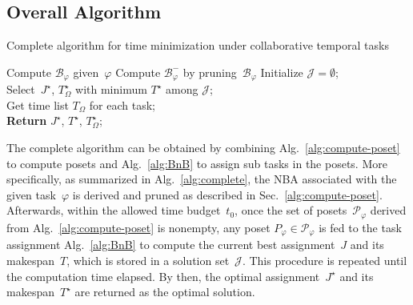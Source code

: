 \subsection{Overall Algorithm}\label{subsubsec:overall-algorithm}

\begin{algorithm}[t]\footnotesize
	\caption{\footnotesize Complete algorithm for time minimization
        under collaborative temporal tasks}
	\label{alg:complete}
	Compute $\mathcal{B}_{\varphi}$ given~$\varphi$ 
	Compute $\mathcal{B}^{-}_{\varphi}$ by pruning~$\mathcal{B}_{\varphi}$
        Initialize $\mathcal{J}=\emptyset$;\\
        Select~$J^\star$, $T^\star_\Omega$ with minimum $T^\star$ among $\mathcal{J}$;\\
        Get time list $T_\Omega$ for each task;\\
	\textbf{Return} $J^\star$, $T^\star$, $T^\star_\Omega$;
\end{algorithm}

The complete algorithm can be obtained by combining
Alg.~\ref{alg:compute-poset} to compute posets
and Alg.~\ref{alg:BnB} to assign sub tasks in the posets.
More specifically, as summarized in Alg.~\ref{alg:complete},
the NBA associated with the given task~$\varphi$ is derived and pruned as
described in Sec.~\ref{alg:compute-poset}.
Afterwards, within the allowed time budget~$t_0$,
once the set of posets~$\mathcal{P}_{\varphi}$ derived from
Alg.~\ref{alg:compute-poset}
is nonempty, any poset $P_\varphi\in \mathcal{P}_{\varphi}$ is fed to
the task assignment Alg.~\ref{alg:BnB} to compute the current best
assignment~$J$ and its makespan~$T$, which is stored in
a solution set~$\mathcal{J}$.
This procedure is repeated until the computation time elapsed.
By then, the optimal assignment~$J^\star$ and its makespan~$T^\star$
are returned as the optimal solution.

